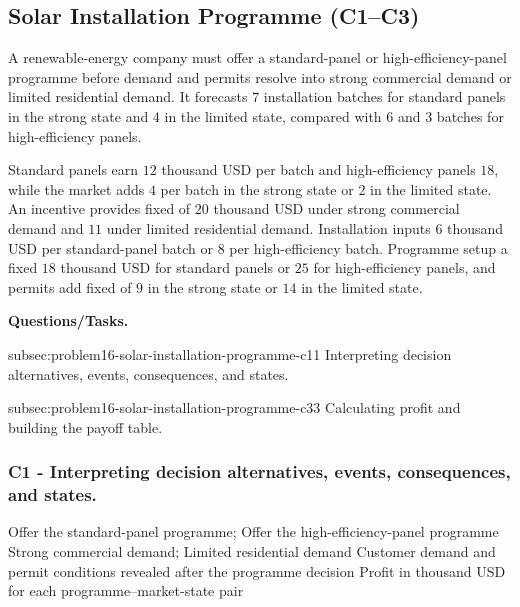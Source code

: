 	\subsection{Solar Installation Programme (C1--C3)}
	\label{sec:problem16-solar-installation-programme-c1-c3}

	A renewable-energy company must offer a standard-panel or high-efficiency-panel programme before demand and permits resolve into strong commercial demand or limited residential demand. It forecasts \(7\) installation batches for standard panels in the strong state and \(4\) in the limited state, compared with \(6\) and \(3\) batches for high-efficiency panels.

	Standard panels earn \(12\) thousand USD per batch and high-efficiency panels \(18\), while the market adds \(4\) per batch in the strong state or \(2\) in the limited state. An incentive provides fixed  of \(20\) thousand USD under strong commercial demand and \(11\) under limited residential demand. Installation inputs  \(6\) thousand USD per standard-panel batch or \(8\) per high-efficiency batch. Programme setup  a fixed \(18\) thousand USD for standard panels or \(25\) for high-efficiency panels, and permits add fixed  of \(9\) in the strong state or \(14\) in the limited state.

	\textbf{Questions/Tasks.}
	\begin{enumerate}
		\CriterionTask
		{subsec:problem16-solar-installation-programme-c1}{1}
		{Interpreting decision alternatives, events, consequences, and states.}

		\CriterionTask
		{subsec:problem16-solar-installation-programme-c3}{3}
		{Calculating profit and building the payoff table.}
	\end{enumerate}

	\subsubsection*{C1 - Interpreting decision alternatives, events, consequences, and states.}
	\label{subsec:problem16-solar-installation-programme-c1}

	\DecisionElementsTable
	{Offer the standard-panel programme; Offer the high-efficiency-panel programme}
	{Strong commercial demand; Limited residential demand}
	{Customer demand and permit conditions revealed after the programme decision}
	{Profit in thousand USD for each programme--market-state pair}


